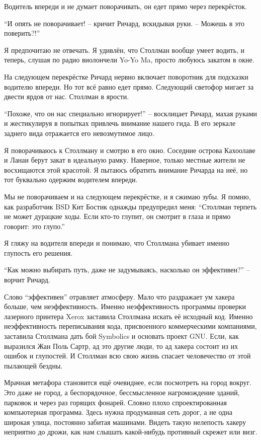 Водитель впереди и не думает поворачивать, он едет прямо через перекрёсток.

\enquote{И опять не поворачивает! -- кричит Ричард, вскидывая руки. -- Можешь в это поверить?!}

Я предпочитаю не отвечать. Я удивлён, что Столлман вообще умеет водить, и теперь, слушая по радио виолончели Yo-Yo Ma, просто любуюсь закатом в окне.

На следующем перекрёстке Ричард нервно включает поворотник для подсказки водителю впереди. Но тот всё равно едет прямо. Следующий светофор мигает за двести ярдов от нас. Столлман в ярости.

\enquote{Похоже, что он нас специально игнорирует!} -- восклицает Ричард, махая руками и жестикулируя в попытках привлечь внимание нашего гида. В его зеркале заднего вида отражается его невозмутимое лицо.

Я поворачиваюсь к Столлману и смотрю в его окно. Соседние острова Кахоолаве и Ланаи берут закат в идеальную рамку. Наверное, только местные жители не восхищаются этой красотой. Я пытаюсь обратить внимание Ричарда на неё, но тот буквально одержим водителем впереди.

Мы не поворачиваем и на следующем перекрёстке, и я сжимаю зубы. Я помню, как разработчик BSD Кит Бостик однажды предупредил меня: \enquote{Столлман терпеть не может дурацкие ходы. Если кто-то глупит, он смотрит в глаза и прямо говорит: это глупо.\hspace{0.01in}}

Я гляжу на водителя впереди и понимаю, что Столлмана убивает именно глупость его решения.

\enquote{Как можно выбирать путь, даже не задумываясь, насколько он эффективен?} -- ворчит Ричард.

Слово \enquote{эффективен} отравляет атмосферу. Мало что раздражает ум хакера больше, чем неэффективность. Именно неэффективность программы проверки лазерного принтера Xerox заставила Столлмана искать её исходный код. Именно неэффективность переписывания кода, присвоенного коммерческими компаниями, заставила Столлмана дать бой Symbolics и основать проект GNU. Если, как выразился Жан Поль Сартр, ад это другие люди, то ад хакера состоит из их ошибок и глупостей. И Столлман всю свою жизнь спасает человечество от этой пылающей бездны.

Мрачная метафора становится ещё очевиднее, если посмотреть на город вокруг. Это даже не город, а беспорядочное, бессмысленное нагромождение зданий, парковок и через раз горящих фонарей. Словно плохо спроектированная компьютерная программа. Здесь нужна продуманная сеть дорог, а не одна широкая улица, постоянно забитая машинами. Видеть такую нелепость хакеру неприятно до дрожи, как нам слышать какой-нибудь противный скрежет или визг.

